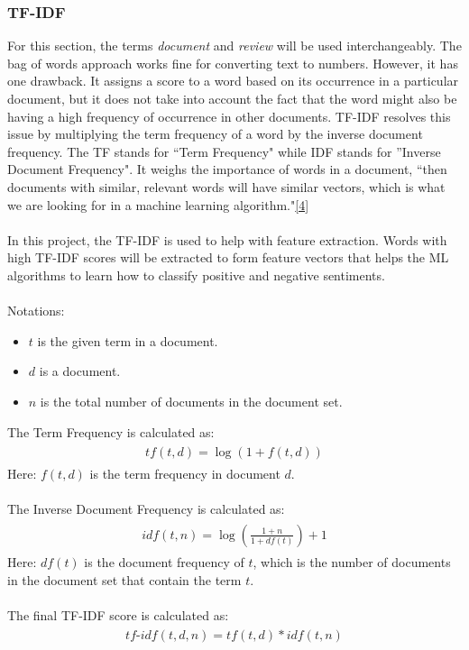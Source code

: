 \documentclass[a4paper]{report}
\begin{document}
\subsubsection{TF-IDF}
For this section, the terms \textit{document} and \textit{review} will be used interchangeably. The bag of words approach works fine for converting text to numbers. However, it has one drawback. It assigns a score to a word based on its occurrence in a particular document, but it does not take into account the fact that the word might also be having a high frequency of occurrence in other documents. TF-IDF resolves this issue by multiplying the term frequency of a word by the inverse document frequency. The TF stands for “Term Frequency" while IDF stands for ”Inverse Document Frequency". It weighs the importance of words in a document, ``then documents with similar, relevant words will have similar vectors, which is what we are looking for in a machine learning algorithm."\href{https://monkeylearn.com/blog/what-is-tf-idf/#:~:text=TF%2DIDF%20enables%20us%20to,in%20a%20machine%20learning%20algorithm.}{[4]}
\\\\
In this project, the TF-IDF is used to help with feature extraction. Words with high TF-IDF scores will be extracted to form feature vectors that helps the ML algorithms to learn how to classify positive and negative sentiments.
\\\\
Notations:
\begin{itemize}
  \item \(t\) is the given term in a document.
  \item \(d\) is a document.
  \item \(n\) is the total number of documents in the document set.
\end{itemize}
\noindent
The Term Frequency is calculated as:
\begin{eqnarray*}
    \begin{aligned}
        tf(t, d) = \log{(1 + f(t, d))}
    \end{aligned}
 \end{eqnarray*}
Here: \(f(t, d)\) is the term frequency in document \(d\).
\\\\
The Inverse Document Frequency is calculated as:
\begin{eqnarray*}
    \begin{aligned}
        idf(t, n) = \log{\left(\frac{1 + n}{1 + df(t)}\right)} + 1
    \end{aligned}
 \end{eqnarray*}
Here: \(df(t)\) is the document frequency of \(t\), which is the number of documents in the document set that contain the term \(t\).
\\\\
The final TF-IDF score is calculated as:
\begin{eqnarray*}
    \begin{aligned}
        tf\text{-}idf(t, d, n) = tf(t, d)*idf(t, n)
    \end{aligned}
 \end{eqnarray*}
\end{document}
